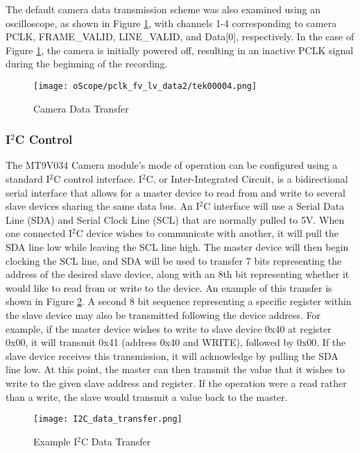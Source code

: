 \par
The default camera data transmission scheme was also examined using an oscilloscope, as shown in Figure \ref{camDataTransfer}, with channels 1-4 corresponding to camera PCLK, FRAME\_VALID, LINE\_VALID, and Data[0], respectively. In the case of Figure \ref{camDataTransfer}, the camera is initially powered off, resulting in an inactive PCLK signal during the beginning of the recording.
\begin{figure}[H]
	\centerline{\texttt{[image: oScope/pclk\_fv\_lv\_data2/tek00004.png]}}
	\caption{Camera Data Transfer}
	\label{camDataTransfer}
\end{figure}

\subsubsection{I$^2$C Control} \label{cameraI2Cdescription}
The MT9V034 Camera module's mode of operation can be configured using a standard I$^2$C control interface. I$^2$C, or Inter-Integrated Circuit, is a bidirectional serial interface that allows for a master device to read from and write to several slave devices sharing the same data bus. An I$^2$C interface will use a Serial Data Line (SDA) and Serial Clock Line (SCL) that are normally pulled to 5V. When one connected I$^2$C device wishes to communicate with another, it will pull the SDA line low while leaving the SCL line high. The master device will then begin clocking the SCL line, and SDA will be used to transfer 7 bits representing the address of the desired slave device, along with an 8th bit representing whether it would like to read from or write to the device. An example of this transfer is shown in Figure \ref{I2Cexample}. A second 8 bit sequence representing a specific register within the slave device may also be transmitted following the device address. For example, if the master device wishes to write to slave device 0x40 at register 0x00, it will transmit 0x41 (address 0x40 and WRITE), followed by 0x00. If the slave device receives this transmission, it will acknowledge by pulling the SDA line low. At this point, the master can then transmit the value that it wishes to write to the given slave address and register. If the operation were a read rather than a write, the slave would transmit a value back to the master.  
\par
\begin{figure}[H]
	\centerline{\texttt{[image: I2C\_data\_transfer.png]}}
	\caption{Example I$^2$C Data Transfer}
	\label{I2Cexample}
\end{figure}

